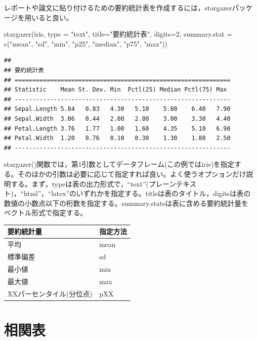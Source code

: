 \documentclass[
]{book}
\newenvironment{Shaded}{\begin{snugshade}}{\end{snugshade}}
\newcommand{\AttributeTok}[1]{\textcolor[rgb]{0.77,0.63,0.00}{#1}}
\newcommand{\DecValTok}[1]{\textcolor[rgb]{0.00,0.00,0.81}{#1}}
\newcommand{\FunctionTok}[1]{\textcolor[rgb]{0.00,0.00,0.00}{#1}}
\newcommand{\NormalTok}[1]{#1}
\newcommand{\StringTok}[1]{\textcolor[rgb]{0.31,0.60,0.02}{#1}}
\begin{document}
レポートや論文に貼り付けるための要約統計表を作成するには，stargazerパッケージを用いると良い。

\begin{Shaded}
\begin{Highlighting}[]
\FunctionTok{stargazer}\NormalTok{(iris, }\AttributeTok{type =} \StringTok{"text"}\NormalTok{, }\AttributeTok{title=}\StringTok{"要約統計表"}\NormalTok{, }\AttributeTok{digits=}\DecValTok{2}\NormalTok{,}
          \AttributeTok{summary.stat =} \FunctionTok{c}\NormalTok{(}\StringTok{"mean"}\NormalTok{, }\StringTok{"sd"}\NormalTok{, }\StringTok{"min"}\NormalTok{, }\StringTok{"p25"}\NormalTok{, }\StringTok{"median"}\NormalTok{, }\StringTok{"p75"}\NormalTok{, }\StringTok{"max"}\NormalTok{))}
\end{Highlighting}
\end{Shaded}

\begin{verbatim}
## 
## 要約統計表
## =============================================================
## Statistic    Mean St. Dev. Min  Pctl(25) Median Pctl(75) Max 
## -------------------------------------------------------------
## Sepal.Length 5.84   0.83   4.30   5.10    5.80    6.40   7.90
## Sepal.Width  3.06   0.44   2.00   2.80    3.00    3.30   4.40
## Petal.Length 3.76   1.77   1.00   1.60    4.35    5.10   6.90
## Petal.Width  1.20   0.76   0.10   0.30    1.30    1.80   2.50
## -------------------------------------------------------------
\end{verbatim}

stargazer()関数では，第1引数としてデータフレーム(この例ではiris)を指定する。そのほかの引数は必要に応じて指定すれば良い。よく使うオプションだけ説明する。まず，typeは表の出力形式で，``text''(プレーンテキスト)，``html''，``latex''のいずれかを指定する。titleは表のタイトル，digitsは表の数値の小数点以下の桁数を指定する。summary.statsは表に含める要約統計量をベクトル形式で指定する。

\begin{longtable}[]{@{}ll@{}}
\toprule
要約統計量 & 指定方法 \\
\midrule
\endhead
平均 & mean \\
標準偏差 & sd \\
最小値 & min \\
最大値 & max \\
XXパーセンタイル(分位点) & pXX \\
\bottomrule
\end{longtable}

\hypertarget{ux76f8ux95a2ux8868}{%
\section{相関表}\label{ux76f8ux95a2ux8868}}
\end{document}
